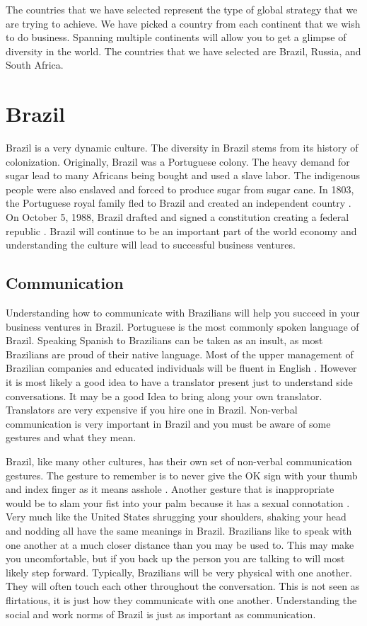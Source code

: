 \documentclass[11pt,a4paper,twoside]{report}
\begin{document}
The countries that we have selected represent the type of global strategy that
we are trying to achieve. We have picked a country from each continent that we
wish to do business. Spanning multiple continents will allow you to get a
glimpse of diversity in the world. The countries that we have selected are
Brazil, Russia, and South Africa.

\chapter{Brazil}

Brazil is a very dynamic culture. The diversity in Brazil stems from its
history of colonization. Originally, Brazil was a Portuguese colony.  The
heavy demand for sugar lead to many Africans being bought and used a slave
labor. The indigenous people were also enslaved and forced to produce sugar
from sugar cane. In 1803, the Portuguese royal family fled to Brazil and
created an independent country \citep*[pg. 614]{kagan}. On
October 5, 1988, Brazil drafted and signed a constitution creating a
federal republic \citep*{brazilCIA}. Brazil
will continue to be an important part of the world economy and
understanding the culture will lead to successful business ventures.

\section{Communication}

Understanding how to communicate with Brazilians will help you succeed in
your business ventures in Brazil. Portuguese is the most commonly spoken
language of Brazil. Speaking Spanish to Brazilians can be taken as an
insult, as most Brazilians are proud of their native language.  Most of the
upper management of Brazilian companies and educated individuals will be
fluent in English \citep*[pg. 62]{herrington}. However it is most likely a good
idea to have a translator present just to understand side conversations. It
may be a good Idea to bring along your own translator. Translators are very
expensive if you hire one in Brazil. Non-verbal communication is very
important in Brazil and you must be aware of some gestures and what they
mean.

Brazil, like many other cultures, has their own set of non-verbal communication
gestures. The gesture to remember is to never give the OK sign with your thumb
and index finger as it means asshole \citep*[pg. 76]{herrington}. Another gesture that
is inappropriate would be to slam your fist into your palm because it has a
sexual connotation \citep*[pg. 76]{herrington}. Very much like the United States
shrugging your shoulders, shaking your head and nodding all have the same
meanings in Brazil.  Brazilians like to speak with one another at a much closer
distance than you may be used to. This may make you uncomfortable, but if you
back up the person you are talking to will most likely step forward. Typically,
Brazilians will be very physical with one another. They will often touch each
other throughout the conversation. This is not seen as flirtatious, it is just
how they communicate with one another. Understanding the social and work norms
of Brazil is just as important as communication.
\end{document}
